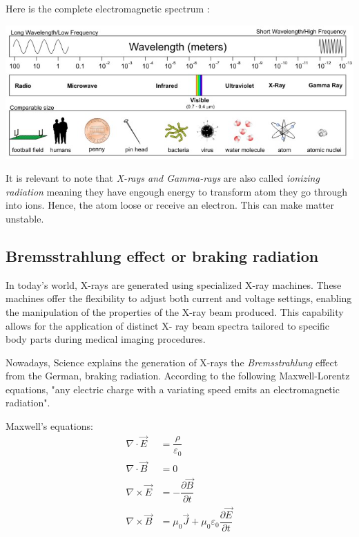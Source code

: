 \documentclass[a4paper,12pt]{report}
\begin{document}
Here is the complete electromagnetic spectrum :
\begin{center}
\includegraphics[scale = 2.4]{elecSpec.jpg}

\label{elecSpec}
\end{center}

It is relevant to note that \textit{X-rays and Gamma-rays} are also called \textit{ionizing radiation} meaning they have engough energy to transform atom they go through into ions. Hence, the atom loose or receive an electron. This can make matter unstable.

\subsection*{Bremsstrahlung effect or braking radiation}

In today's world, X-rays are generated using specialized X-ray machines. These machines offer
the flexibility to adjust both current and voltage settings, enabling the manipulation of the
properties of the X-ray beam produced. This capability allows for the application of distinct X-
ray beam spectra tailored to specific body parts during medical imaging procedures.

Nowadays, Science explains the generation of X-rays  the \textit{Bremsstrahlung }effect from the German, braking radiation. 
According to the following Maxwell-Lorentz equations, "any electric charge with a variating speed emits an electromagnetic radiation".

Maxwell's equations:
\begin{align}
  \nabla \cdot \vec{E} &= \dfrac{\rho}{\varepsilon_0} \\
  \nabla \cdot \vec{B} &= 0 \\
  \nabla \times \vec{E} &= -\dfrac{\partial \vec{B}}{\partial t} \\
  \nabla \times \vec{B} &= \mu_0 \vec{J} + \mu_0 \varepsilon_0 \dfrac{\partial \vec{E}}{\partial t}
\end{align}
\end{document}
